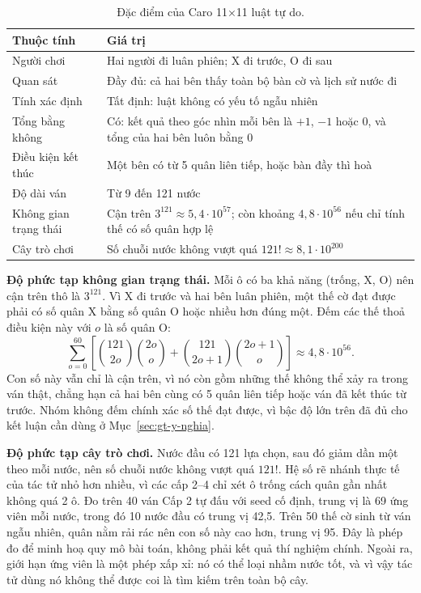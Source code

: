 \begin{table}[!htb]
  \centering\small
  \caption{Đặc điểm của Caro 11×11 luật tự do.}
  \label{tab:gt-dac-diem}
  \begin{tabularx}{\textwidth}{@{}l X@{}}
    \toprule
    \textbf{Thuộc tính} & \textbf{Giá trị} \\
    \midrule
    Người chơi & Hai người đi luân phiên; X đi trước, O đi sau \\
    Quan sát & Đầy đủ: cả hai bên thấy toàn bộ bàn cờ và lịch sử nước đi \\
    Tính xác định & Tất định: luật không có yếu tố ngẫu nhiên \\
    Tổng bằng không & Có: kết quả theo góc nhìn mỗi bên là $+1$, $-1$ hoặc $0$, và tổng của hai bên luôn bằng 0 \\
    Điều kiện kết thúc & Một bên có từ 5 quân liên tiếp, hoặc bàn đầy thì hoà \\
    Độ dài ván & Từ 9 đến 121 nước \\
    Không gian trạng thái & Cận trên $3^{121} \approx 5{,}4 \cdot 10^{57}$; còn khoảng $4{,}8 \cdot 10^{56}$ nếu chỉ tính thế có số quân hợp lệ \\
    Cây trò chơi & Số chuỗi nước không vượt quá $121! \approx 8{,}1 \cdot 10^{200}$ \\
    \bottomrule
  \end{tabularx}
\end{table}

\textbf{Độ phức tạp không gian trạng thái.} Mỗi ô có ba khả năng (trống, X, O) nên cận trên thô là $3^{121}$. Vì X đi trước và hai bên luân phiên, một thế cờ đạt được phải có số quân X bằng số quân O hoặc nhiều hơn đúng một. Đếm các thế thoả điều kiện này với $o$ là số quân O:
\begin{equation}
  \sum_{o=0}^{60} \left[ \binom{121}{2o} \binom{2o}{o} + \binom{121}{2o+1} \binom{2o+1}{o} \right] \approx 4{,}8 \cdot 10^{56}.
\end{equation}
Con số này vẫn chỉ là cận trên, vì nó còn gồm những thế không thể xảy ra trong ván thật, chẳng hạn cả hai bên cùng có 5 quân liên tiếp hoặc ván đã kết thúc từ trước. Nhóm không đếm chính xác số thế đạt được, vì bậc độ lớn trên đã đủ cho kết luận cần dùng ở Mục~\ref{sec:gt-y-nghia}.

\textbf{Độ phức tạp cây trò chơi.} Nước đầu có 121 lựa chọn, sau đó giảm dần một theo mỗi nước, nên số chuỗi nước không vượt quá $121!$. Hệ số rẽ nhánh thực tế của tác tử nhỏ hơn nhiều, vì các cấp 2--4 chỉ xét ô trống cách quân gần nhất không quá 2 ô. Đo trên 40 ván Cấp 2 tự đấu với seed cố định, trung vị là 69 ứng viên mỗi nước, trong đó 10 nước đầu có trung vị 42,5. Trên 50 thế cờ sinh từ ván ngẫu nhiên, quân nằm rải rác nên con số này cao hơn, trung vị 95. Đây là phép đo để minh hoạ quy mô bài toán, không phải kết quả thí nghiệm chính. Ngoài ra, giới hạn ứng viên là một phép xấp xỉ: nó có thể loại nhầm nước tốt, và vì vậy tác tử dùng nó không thể được coi là tìm kiếm trên toàn bộ cây.

